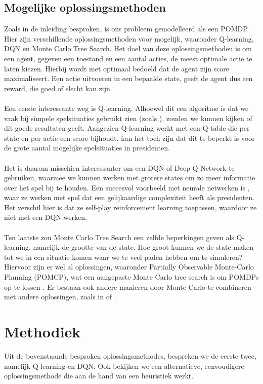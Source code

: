 \documentclass[11pt]{article}
\begin{document}
\subsection{Mogelijke oplossingsmethoden}
Zoals in de inleiding besproken, is ons probleem gemodelleerd als een POMDP. Hier zijn verschillende oplossingsmethoden voor mogelijk, waaronder Q-learning, DQN en Monte Carlo Tree Search. Het doel van deze oplossingsmethoden is om een agent, gegeven een toestand en een aantal acties, de meest optimale actie te laten kiezen. Hierbij wordt met optimaal bedoeld dat de agent zijn score maximaliseert. Een actie uitvoeren in een bepaalde state, geeft de agent dus een reward, die goed of slecht kan zijn.\\\\ 
Een eerste interessante weg is Q-learning. Alhoewel dit een algoritme is dat we vaak bij simpele spelsituaties gebruikt zien (zoals \cite{simple-qlearning}), zouden we kunnen kijken of dit goede resultaten geeft. Aangezien Q-learning werkt met een Q-table die per state en per actie een score bijhoudt, kan het toch zijn dat dit te beperkt is voor de grote aantal mogelijke spelsituaties in presidenten. \\\\
Het is daarom misschien interessanter om een DQN of Deep Q-Network te gebruiken, waarmee we kunnen werken met grotere states om zo meer informatie over het spel bij te houden. Een succesvol voorbeeld met neurale netwerken is \cite{nn-paper}, waar ze werken met spel dat een gelijkaardige complexiteit heeft als presidenten. Het verschil hier is dat ze self-play reinforcement learning toepassen, waardoor ze niet met een DQN werken.\\\\
Ten laatste zou Monte Carlo Tree Search een zelfde beperkingen geven als Q-learning, namelijk de grootte van de state. Hoe groot kunnen we de state maken tot we in een situatie komen waar we te veel paden hebben om te simuleren? Hiervoor zijn er wel al oplossingen, waaronder Partially Observable Monte-Carlo Planning (POMCP), wat een aangepaste Monte Carlo tree search is om POMDPs op te lossen \cite{mct-1}. Er bestaan ook andere manieren door Monte Carlo te combineren met andere oplossingen, zoals in \cite{mct-2} of \cite{mct-3}.
\newpage
\section{Methodiek}
Uit de bovenstaande besproken oplossingsmethodes, bespreken we de eerste twee, namelijk Q-learning en DQN. Ook bekijken we een alternatieve, eenvoudigere oplossingsmethode die aan de hand van een heuristiek werkt.
\end{document}
